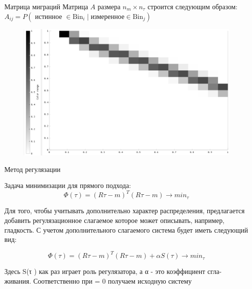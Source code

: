\documentclass[fullscreen=true,russian,compress,%
	hyperref={unicode,bookmarks=false}]{presentation}
\begin{document}
\begin{frame}{Матрица миграций}
   Матрица $A$ размера $n_{m} \times n_{\tau}$ строится следующим образом:
   $A_{ij} = P( \text{ истинное } \in \text{Bin}_{i} \mid \text{измеренное} \in \text{Bin}_{j} )$
\begin{figure}[!ht]
   \includegraphics[scale=0.3]{images/gaus_mig_black.png}
\end{figure}
\end{frame}




\begin{frame}{Метод регулязации}
\begin{block}{}
   Задача минимизации для прямого подхода:
   \begin{equation}
      \Phi(\tau)=(R\tau-m)^T (R\tau-m) \to min_{\tau}
      \label{min_base}
   \end{equation}
\end{block}
\begin{block}{}
   Для того, чтобы учитывать дополнительно характер распределения, предлагается добавить регулязационное слагаемое  
   которое может описывать, например, гладкость. С учетом дополнительного слагаемого система будет иметь следующий вид: 

   \begin{equation}
      \Phi(\tau)=(R\tau-m)^T (R\tau-m) + \alpha S(\tau) \to min_{\tau}
      \label{min_svd}
   \end{equation}

   Здесь S(τ ) как раз играет роль регулязатора, а α - это коэффициент сгла-
   живания. Соответственно при \alpha = 0 получаем исходную систему
\end{block}
\end{frame}
\end{document}
